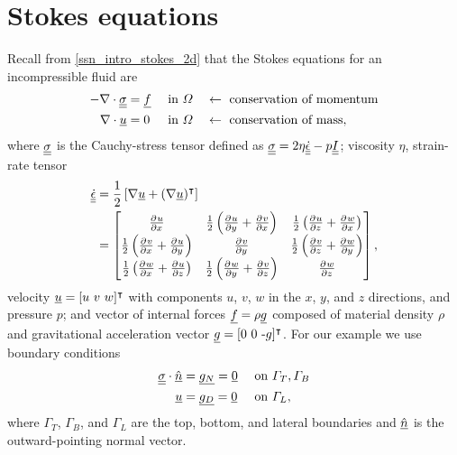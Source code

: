 
\section{Stokes equations} \label{ssn_intro_stokes_3d}

Recall from \cref{ssn_intro_stokes_2d} that the Stokes equations for an incompressible fluid are
\begin{align}
  \label{intro_stokes_3d_momentum}
  -\nabla \cdot \underline{\underline{\sigma}} &= \underline{f} &&\text{ in } \varOmega &&\leftarrow \text{ conservation of momentum} \\
  \label{intro_stokes_3d_mass}
  \nabla \cdot \underline{u} &= 0 &&\text{ in } \varOmega &&\leftarrow \text{ conservation of mass},
\end{align}
where $\underline{\underline{\sigma}}$ is the Cauchy-stress tensor defined as $\underline{\underline{\sigma}} = 2\eta \underline{\underline{\dot{\epsilon}}} - p\underline{\underline{I}}$; viscosity $\eta$, strain-rate tensor
\begin{align}
  \label{intro_strain_rate_tensor}
  \underline{\underline{\dot{\epsilon}}} &= \frac{1}{2}\left[\nabla \underline{u} + (\nabla \underline{u})^\intercal \right] \notag \\
  &= \begin{bmatrix}
       \frac{\partial{^{}} u}{\partial x{^{}} } & \frac{1}{2}\left( \frac{\partial{^{}} u}{\partial y{^{}} } + \frac{\partial{^{}} v}{\partial x{^{}} } \right) & \frac{1}{2}\left( \frac{\partial{^{}} u}{\partial z{^{}} } + \frac{\partial{^{}} w}{\partial x{^{}} } \right) \\
       \frac{1}{2}\left( \frac{\partial{^{}} v}{\partial x{^{}} } + \frac{\partial{^{}} u}{\partial y{^{}} } \right) & \frac{\partial{^{}} v}{\partial y{^{}} } & \frac{1}{2}\left( \frac{\partial{^{}} v}{\partial z{^{}} } + \frac{\partial{^{}} w}{\partial y{^{}} } \right) \\
       \frac{1}{2}\left( \frac{\partial{^{}} w}{\partial x{^{}} } + \frac{\partial{^{}} u}{\partial z{^{}} } \right) & \frac{1}{2}\left( \frac{\partial{^{}} w}{\partial y{^{}} } + \frac{\partial{^{}} v}{\partial z{^{}} } \right) & \frac{\partial{^{}} w}{\partial z{^{}} }
     \end{bmatrix},
\end{align}
velocity $\underline{u} = [u\ v\ w]^\intercal$ with components $u$, $v$, $w$ in the $x$, $y$, and $z$ directions, and pressure $p$; and vector of internal forces $\underline{f} = \rho \underline{g}$ composed of material density $\rho$ and gravitational acceleration vector $\underline{g} = [0\ 0\ \text{-}g]^\intercal$.  For our example we use boundary conditions
\begin{align}
  \label{intro_stokes_3d_bc_n}
  \underline{\underline{\sigma}} \cdot \underline{\hat{n}} &= \underline{g_N} = \underline{0} &&\text{ on } \varGamma_T, \varGamma_B \\
  \label{intro_stokes_3d_bc_d}
  \underline{u} &= \underline{g_D} = \underline{0} && \text{ on } \varGamma_L,
\end{align}
where $\Gamma_T$, $\Gamma_B$, and $\Gamma_L$ are the top, bottom, and lateral boundaries and $\underline{\hat{n}}$ is the outward-pointing normal vector.


